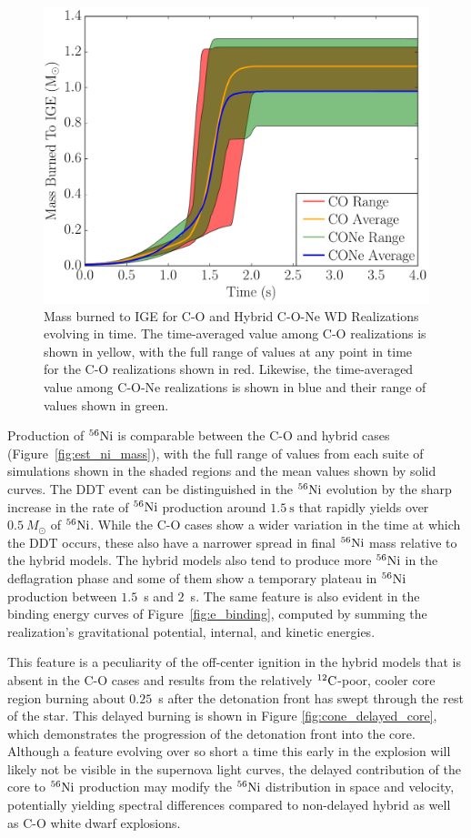 \documentclass[iop,apj]{emulateapj}
\newcommand{\figref}[1]{Figure~\ref{#1}}
\newcommand{\C}[1]{\ensuremath{{}^{#1}{\rm C}}}
\newcommand{\Ni}[1]{\ensuremath{{}^{#1}{\rm Ni}}}
\newcommand{\unitstyle}[1]{\ensuremath{\mathrm{#1}}}
\newcommand{\second}{\unitstyle{s}}
\newcommand{\Msun}{\ensuremath{M_\odot}}
\begin{document}
\begin{figure}[!ht]
	\includegraphics[width=\linewidth]{figures/cf_shaded/mass_burned_to_NSE.pdf}
	\caption{\label{fig:nse_burn_mass} Mass burned to IGE for C-O and Hybrid C-O-Ne WD Realizations evolving in time. The time-averaged value among C-O realizations is shown in yellow, with the full range of values at any point in time for the C-O realizations shown in red. Likewise, the time-averaged value among C-O-Ne realizations is shown in blue and their range of values shown in green.}
\end{figure}

Production of \Ni{56} is comparable between the C-O and hybrid cases
(\figref{fig:est_ni_mass}), with the full range of values from each
suite of simulations shown in the shaded regions and the mean values
shown by solid curves. The DDT event can be distinguished in the
\Ni{56} evolution by the sharp increase in the rate of \Ni{56}
production around $1.5~\second$ that rapidly yields over $0.5~\Msun$ of
\Ni{56}. While the C-O cases show a wider variation in the time at
which the DDT occurs, these also have a narrower spread in final
\Ni{56} mass relative to the hybrid models. The hybrid models also
tend to produce more \Ni{56} in the deflagration phase and some of
them show a temporary plateau in \Ni{56} production between $1.5$~s
and $2$~s. The same feature is also evident in the binding energy
curves of \figref{fig:e_binding}, computed by summing the
realization's gravitational potential, internal, and kinetic energies.

This feature is a peculiarity of the off-center ignition in the hybrid models that is 
absent in the C-O cases and results from the relatively \C{12}-poor,
cooler core region burning about $0.25$~s after the detonation front has
swept through the rest of the star. This delayed burning is shown in
Figure \ref{fig:cone_delayed_core}, which demonstrates the progression of
the detonation front into the core. Although a feature evolving over so
short a time this early in the explosion will likely not be visible in
the supernova light curves, the delayed contribution
of the core to \Ni{56} production may modify the \Ni{56} distribution in
space and velocity, potentially yielding spectral differences compared to non-delayed
hybrid as well as C-O white dwarf explosions.
\end{document}
